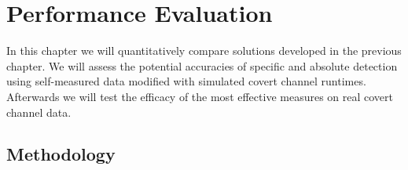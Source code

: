 \documentclass[12pt,a4paper,automark, toc=bib]{scrreprt}
\theoremstyle{definition}
\begin{document}
		
		
	\chapter{Performance Evaluation}
		In this chapter we will quantitatively compare solutions developed in the previous chapter. We will assess the potential accuracies of specific and absolute detection using self-measured data modified with simulated covert channel runtimes. Afterwards we will test the efficacy of the most effective measures on real covert channel data.
		\section{Methodology}
		
\end{document}
